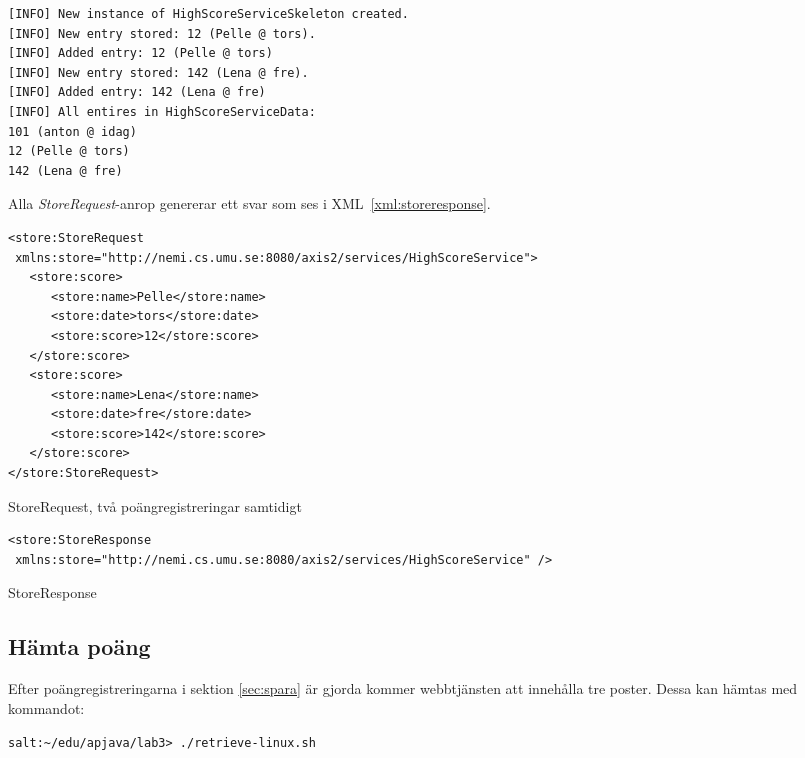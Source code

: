 \documentclass[a4paper, 12pt]{article}
\begin{document}
\begin{footnotesize}
\begin{verbatim}
[INFO] New instance of HighScoreServiceSkeleton created.
[INFO] New entry stored: 12 (Pelle @ tors).
[INFO] Added entry: 12 (Pelle @ tors)
[INFO] New entry stored: 142 (Lena @ fre).
[INFO] Added entry: 142 (Lena @ fre)
[INFO] All entires in HighScoreServiceData:
101 (anton @ idag)
12 (Pelle @ tors)
142 (Lena @ fre)
\end{verbatim}
\end{footnotesize}

Alla \textit{StoreRequest}-anrop genererar ett svar som ses i
XML~\ref{xml:storeresponse}.

\begin{xml}
  \begin{footnotesize}
\begin{verbatim}
<store:StoreRequest
 xmlns:store="http://nemi.cs.umu.se:8080/axis2/services/HighScoreService">
   <store:score>
      <store:name>Pelle</store:name>
      <store:date>tors</store:date>
      <store:score>12</store:score>
   </store:score>
   <store:score>
      <store:name>Lena</store:name>
      <store:date>fre</store:date>
      <store:score>142</store:score>
   </store:score>
</store:StoreRequest>
\end{verbatim}
  \end{footnotesize}
  \caption{StoreRequest, två poängregistreringar samtidigt}\label{xml:store2}
\end{xml}

\begin{xml}
  \begin{footnotesize}
\begin{verbatim}
<store:StoreResponse
 xmlns:store="http://nemi.cs.umu.se:8080/axis2/services/HighScoreService" />
\end{verbatim}
  \end{footnotesize}
  \caption{StoreResponse}\label{xml:storeresponse}
\end{xml}

\subsection{Hämta poäng}
Efter poängregistreringarna i sektion \ref{sec:spara} är gjorda
kommer webbtjänsten att innehålla tre poster. Dessa kan hämtas med
kommandot:

\begin{footnotesize}
\verb!salt:~/edu/apjava/lab3> ./retrieve-linux.sh!
\end{footnotesize}
\end{document}
